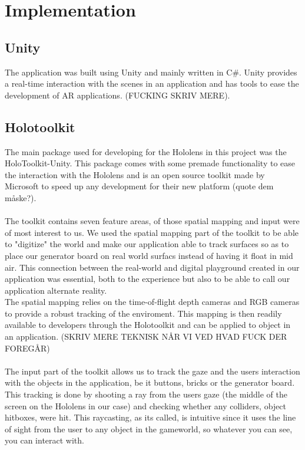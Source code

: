 \section{Implementation}

\subsection{Unity}
The application was built using Unity and mainly written in C\#. Unity provides a real-time interaction with the scenes in an application and has tools to ease the development of AR applications. (FUCKING SKRIV MERE).

\subsection{Holotoolkit}
The main package used for developing for the Hololens in this project was the HoloToolkit-Unity. This package comes with some premade functionality to ease the interaction with the Hololens and is an open source toolkit made by Microsoft to speed up any development for their new platform (quote dem måske?).\\
\\
The toolkit contains seven feature areas, of those spatial mapping and input were of most interest to us. We used the spatial mapping part of the toolkit to be able to "digitize" the world and make our application able to track surfaces so as to place our generator board on real world surfacs instead of having it float in mid air. This connection between the real-world and digital playground created in our application was essential, both to the experience but also to be able to call our application alternate reality.\\
The spatial mapping relies on the time-of-flight depth cameras and RGB cameras to provide a robust tracking of the enviroment. This mapping is then readily available to developers through the Holotoolkit and can be applied to object in an application.
(SKRIV MERE TEKNISK NÅR VI VED HVAD FUCK DER FOREGÅR) 
\\\\
The input part of the toolkit allows us to track the gaze and the users interaction with the objects in the application, be it buttons, bricks or the generator board. This tracking is done by shooting a ray from the users gaze (the middle of the screen on the Hololens in our case) and checking whether any colliders, object hitboxes, were hit. This raycasting, as its called, is intuitive since it uses the line of sight from the user to any object in the gameworld, so whatever you can see, you can interact with.\\
